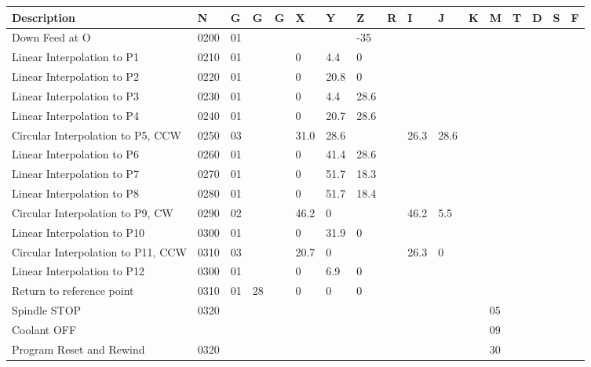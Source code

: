 \begin{landscape}
\begin{longtable}{|l|l|l|l|l|l|l|l|l|l|l|l|l|l|l|l|l|}
\hline
\textbf{Description} &\textbf{N}& \textbf{G} & \textbf{G} & \textbf{G} & \textbf{X} & \textbf{Y} & \textbf{Z} & \textbf{R} & \textbf{I} & \textbf{J} & \textbf{K} & \textbf{M} & \textbf{T} & \textbf{D} & \textbf{S} & \textbf{F}\\
\hline
Down Feed at O & 0200 & 01 & & & & & -35 & & & & & & & & &\\
\hline
Linear Interpolation to P1 & 0210 & 01 & & & 0 & 4.4 & 0 & & & & & & & & &\\
Linear Interpolation to P2 & 0220 & 01 & & & 0 & 20.8 & 0 & & & & & & & & &\\
\hline
Linear Interpolation to P3 & 0230 & 01 & & & 0 & 4.4 & 28.6 & & & & & & & & &\\
\hline
Linear Interpolation to P4 & 0240 & 01 & & & 0 & 20.7 & 28.6 & & & & & & & & &\\
\hline
Circular Interpolation to P5, CCW & 0250 & 03 & & & 31.0 & 28.6 & & & 26.3 & 28.6 & & & & & &\\
\hline
Linear Interpolation to P6 & 0260 & 01 & & & 0 & 41.4 & 28.6 & & & & & & & & &\\
\hline
Linear Interpolation to P7 & 0270 & 01 & & & 0 & 51.7 & 18.3 & & & & & & & & &\\
\hline
Linear Interpolation to P8 & 0280 & 01 & & & 0 & 51.7 & 18.4 & & & & & & & & &\\
\hline
Circular Interpolation to P9, CW & 0290 & 02 & & & 46.2 & 0 & & & 46.2 & 5.5 & & & & & &\\
\hline
Linear Interpolation to P10 & 0300 & 01 & & & 0 & 31.9 & 0 & & & & & & & & &\\
\hline
Circular Interpolation to P11, CCW & 0310 & 03 & & & 20.7 & 0 & & & 26.3 & 0 & & & & & &\\
\hline
Linear Interpolation to P12 & 0300 & 01 & & & 0 & 6.9 & 0 & & & & & & & & &\\
\hline
Return to reference point & 0310 & 01 & 28 & & 0 & 0 &  0 & & & & & & & & &\\
\hline
Spindle STOP & 0320 & & & & & & & & & & & 05 & & & & \\
\hline
Coolant OFF & & & & & & & & & & & & 09 & & & &\\
\hline
Program Reset and Rewind & 0320 & & & & & & & & & & & 30 & & & & \\
\hline
\hline
\end{longtable}
\end{landscape}